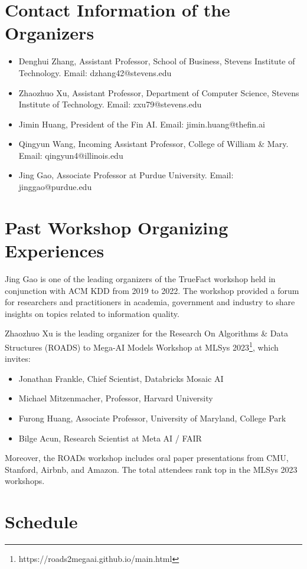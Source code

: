 \documentclass[conference]{IEEEtran}
\begin{document}
\section{Contact Information of the Organizers}
\begin{itemize}
    \item Denghui Zhang, Assistant Professor, School of Business, Stevens Institute of Technology. Email: dzhang42@stevens.edu
    \item  Zhaozhuo Xu, Assistant Professor, Department of Computer Science, Stevens Institute of Technology. Email: zxu79@stevens.edu
    \item Jimin Huang, President of the Fin AI. Email: jimin.huang@thefin.ai
    \item Qingyun Wang, Incoming Assistant Professor, College of William \& Mary. Email: qingyun4@illinois.edu
    \item Jing Gao, Associate Professor at Purdue University. Email: jinggao@purdue.edu
\end{itemize}

\section{Past Workshop Organizing Experiences}
Jing Gao is one of the leading organizers of the TrueFact workshop held in conjunction with ACM KDD from 2019 to 2022. The workshop provided a forum for researchers and practitioners in academia, government and industry to share insights on topics related to information quality. 

Zhaozhuo Xu is the leading organizer for the Research On Algorithms \& Data Structures (ROADS) to Mega-AI Models Workshop at MLSys 2023\footnote{https://roads2megaai.github.io/main.html}, which invites:
\begin{itemize}
    \item Jonathan Frankle, Chief Scientist, Databricks Mosaic AI
    \item Michael Mitzenmacher, Professor, Harvard University
    \item Furong Huang, Associate Professor, University of Maryland, College Park
    \item Bilge Acun, Research Scientist at Meta AI / FAIR
\end{itemize}
Moreover, the ROADs workshop includes oral paper presentations from CMU, Stanford, Airbnb, and Amazon. The total attendees rank top in the MLSys 2023 workshops.

\section{Schedule}
\end{document}
